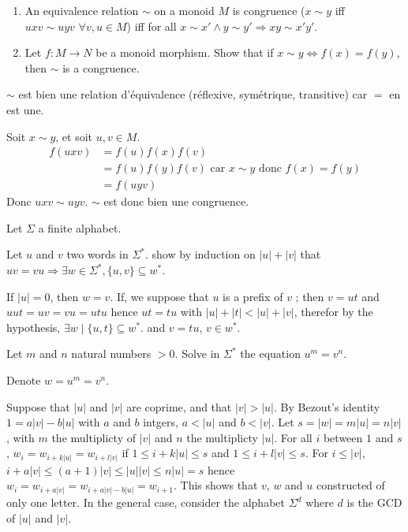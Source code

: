 \documentclass[a4paper,11pt]{exam}
\begin{document}
\begin{questions}
  \question
  \begin{enumerate}
  	\item An equivalence relation $\sim$ on a monoid $M$ is congruence ($x\sim y$ iff $uxv\sim uyv \,\,\forall v,u\in M$) iff for all $x\sim x' \wedge y \sim y' \Rightarrow xy \sim x'y'$.
  	\item Let $f: M \to N$ be a monoid morphism.
  	Show that if $x \sim y \Leftrightarrow f(x) =f(y)$, then $\sim$ is a
  	congruence.
  \end{enumerate}
  
  \begin{solution}
  	$\sim$ est bien une relation d'équivalence (réflexive, symétrique,
  	transitive) car $=$ en est une.
  	
  	Soit $x \sim y$, et soit $u,v \in M$.
  	\begin{align*}
  	f(uxv) &= f(u)f(x)f(v) \\
  	&= f(u)f(y)f(v) \text{ car } x \sim y \text{ donc } f(x)=f(y) \\
  	&= f(uyv)
  	\end{align*}
  	Donc $uxv \sim uyv$.
  	$\sim$ est donc bien une congruence.
  \end{solution}

\bigskip\bigskip
  \hspace{-0.2cm}Let $\Sigma$ a finite alphabet.

  \question \label{uvvu}
  Let $u$ and $v$ two words in $\Sigma^*$.
  show  by induction on $|u| + |v|$
  that $uv=vu \Rightarrow {\exists w \in \Sigma^*,} \{u,v\} \subseteq w^*$.

  \begin{solution}
    If $|u|=0$, then $w=v$.
    If, we suppose that $u$ is a prefix of $v$ ; 
    then $v=ut$ and $uut=uv=vu=utu$ hence $ut=tu$ with $|u|+|t|<|u|+|v|$,
    therefor by the hypothesis, $\exists w \mid \{u,t\} \subseteq w^*$.
    and $v=tu$, $v \in w^*$.
  \end{solution}

  \question
  Let $m$ and $n$ natural numbers $>0$.
  Solve in $\Sigma^*$ the equation $u^m = v^n$. 

  \begin{solution}
    Denote $w=u^m=v^n$.

    Suppose that $|u|$ and $|v|$ are coprime,
	and that $|v|>|u|$.
    By Bezout's identity $1=a|v|-b|u|$ with $a$ and $b$ intgers, $a<|u|$ and $b<|v|$.
    Let $s=|w|=m|u|=n|v|$, with $m$ the multiplicty of $|v|$ and $n$ the multiplicty $|u|$.
    For all $i$ between $1$ and $s$, $w_i=w_{i+k|u|}=w_{i+l|v|}$ if $1 \leq i+k|u| \leq s$ and $1 \leq i+l|v| \leq s$.
    For $i \leq |v|$, $i+a|v| \leq (a+1)|v| \leq |u||v| \leq n|u| = s$ hence
    $w_i = w_{i+a|v|} = w_{i+a|v|-b|u|}=w_{i+1}$.
    This shows that $v$, $w$ and $u$ constructed of only one letter.
    In the general case, consider the alphabet $\Sigma^d$ where $d$ is
    the GCD of $|u|$ and $|v|$.
  \end{solution}


\end{questions}
\end{document}
